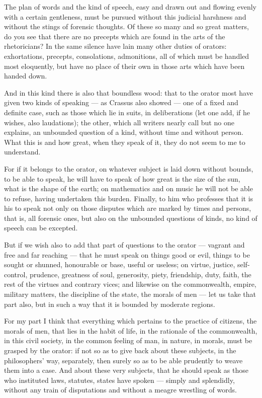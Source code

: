  The plan of words and the kind of speech, easy and drawn out and flowing evenly with a certain gentleness, must be pursued without this judicial harshness and without the stings of forensic thoughts. Of these so many and so great matters, do you see that there are no precepts which are found in the arts of the rhetoricians? In the same silence have lain many other duties of orators: exhortations, precepts, consolations, admonitions, all of which must be handled most eloquently, but have no place of their own in those arts which have been handed down.

 And in this kind there is also that boundless wood: that to the orator most have given two kinds of speaking — as Crassus also showed — one of a fixed and definite case, such as those which lie in suits, in deliberations (let one add, if he wishes, also laudations); the other, which all writers nearly call but no one explains, an unbounded question of a kind, without time and without person. What this is and how great, when they speak of it, they do not seem to me to understand.

 For if it belongs to the orator, on whatever subject is laid down without bounds, to be able to speak, he will have to speak of how great is the size of the sun, what is the shape of the earth; on mathematics and on music he will not be able to refuse, having undertaken this burden. Finally, to him who professes that it is his to speak not only on those disputes which are marked by times and persons, that is, all forensic ones, but also on the unbounded questions of kinds, no kind of speech can be excepted.

 But if we wish also to add that part of questions to the orator — vagrant and free and far reaching — that he must speak on things good or evil, things to be sought or shunned, honourable or base, useful or useless; on virtue, justice, self-control, prudence, greatness of soul, generosity, piety, friendship, duty, faith, the rest of the virtues and contrary vices; and likewise on the commonwealth, empire, military matters, the discipline of the state, the morals of men — let us take that part also, but in such a way that it is bounded by moderate regions.

 For my part I think that everything which pertains to the practice of citizens, the morals of men, that lies in the habit of life, in the rationale of the commonwealth, in this civil society, in the common feeling of man, in nature, in morals, must be grasped by the orator: if not so as to give back about these subjects, in the philosophers' way, separately, then surely so as to be able prudently to weave them into a case. And about these very subjects, that he should speak as those who instituted laws, statutes, states have spoken — simply and splendidly, without any train of disputations and without a meagre wrestling of words.

